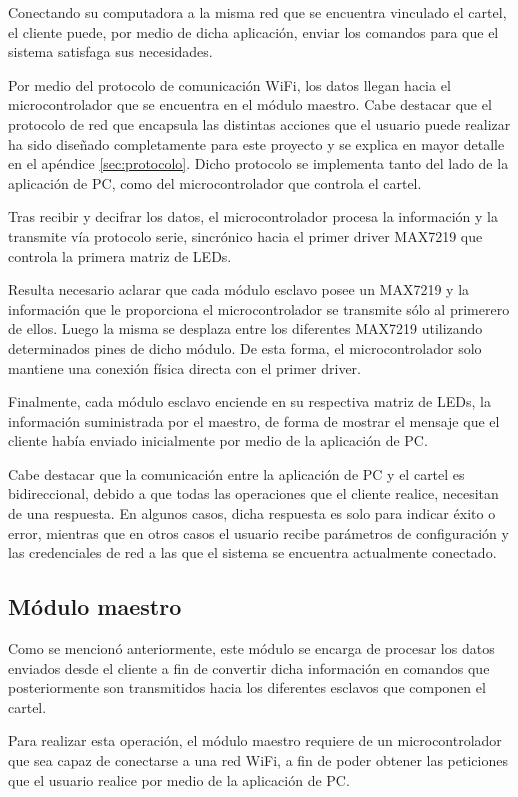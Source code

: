 Conectando su computadora a la misma red que se encuentra vinculado el cartel, el cliente puede, por medio de dicha aplicación, enviar los comandos para que el sistema satisfaga sus necesidades.

Por medio del protocolo de comunicación WiFi, los datos llegan hacia el microcontrolador que se encuentra en el módulo maestro. Cabe destacar que el protocolo de red que encapsula las distintas acciones que el usuario puede realizar ha sido diseñado completamente para este proyecto y se explica en mayor detalle en el apéndice \ref{sec:protocolo}.
Dicho protocolo se implementa tanto del lado de la aplicación de PC, como del microcontrolador que controla el cartel.

Tras recibir y decifrar los datos, el microcontrolador procesa la información y la transmite vía protocolo serie, sincrónico hacia el primer driver MAX7219 que controla la primera matriz de LEDs.

Resulta necesario aclarar que cada módulo esclavo posee un MAX7219 y la información que le proporciona el microcontrolador se transmite sólo al primerero de ellos. Luego la misma se desplaza entre los diferentes MAX7219 utilizando determinados pines de dicho módulo.
De esta forma, el microcontrolador solo mantiene una conexión física directa con el primer driver.

Finalmente, cada módulo esclavo enciende en su respectiva matriz de LEDs, la información suministrada por el maestro, de forma de mostrar el mensaje que el cliente había enviado inicialmente por medio de la aplicación de PC.

Cabe destacar que la comunicación entre la aplicación de PC y el cartel es bidireccional, debido a que todas las operaciones que el cliente realice, necesitan de una respuesta.
En algunos casos, dicha respuesta es solo para indicar éxito o error, mientras que en otros casos el usuario recibe parámetros de configuración y las credenciales de red a las que el sistema se encuentra actualmente conectado.

\subsection{Módulo maestro}
Como se mencionó anteriormente, este módulo se encarga de procesar los datos enviados desde el cliente a fin de convertir dicha información en comandos que posteriormente son transmitidos hacia los diferentes esclavos que componen el cartel. 

Para realizar esta operación, el módulo maestro requiere de un microcontrolador que sea capaz de conectarse a una red WiFi, a fin de poder obtener las peticiones que el usuario realice por medio de la aplicación de PC.

